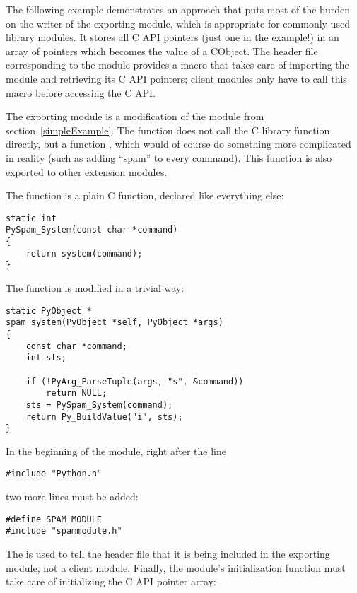 The following example demonstrates an approach that puts most of the
burden on the writer of the exporting module, which is appropriate
for commonly used library modules. It stores all C API pointers
(just one in the example!) in an array of  pointers which
becomes the value of a CObject. The header file corresponding to
the module provides a macro that takes care of importing the module
and retrieving its C API pointers; client modules only have to call
this macro before accessing the C API.

The exporting module is a modification of the  module from
section~\ref{simpleExample}. The function 
does not call the C library function  directly,
but a function , which would of course do
something more complicated in reality (such as adding ``spam'' to
every command). This function  is also
exported to other extension modules.

The function  is a plain C function,
declared  like everything else:

\begin{verbatim}
static int
PySpam_System(const char *command)
{
    return system(command);
}
\end{verbatim}

The function  is modified in a trivial way:

\begin{verbatim}
static PyObject *
spam_system(PyObject *self, PyObject *args)
{
    const char *command;
    int sts;

    if (!PyArg_ParseTuple(args, "s", &command))
        return NULL;
    sts = PySpam_System(command);
    return Py_BuildValue("i", sts);
}
\end{verbatim}

In the beginning of the module, right after the line

\begin{verbatim}
#include "Python.h"
\end{verbatim}

two more lines must be added:

\begin{verbatim}
#define SPAM_MODULE
#include "spammodule.h"
\end{verbatim}

The  is used to tell the header file that it is being
included in the exporting module, not a client module. Finally,
the module's initialization function must take care of initializing
the C API pointer array:

